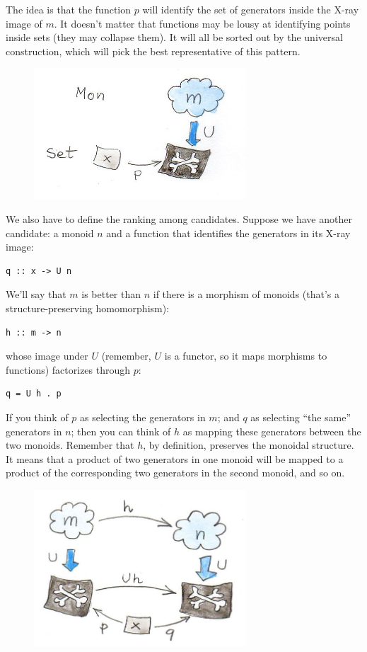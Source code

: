 The idea is that the function $p$ will identify the set of
generators inside the X-ray image of $m$. It doesn't matter that
functions may be lousy at identifying points inside sets (they may
collapse them). It will all be sorted out by the universal construction,
which will pick the best representative of this pattern.

\begin{figure}[H]
\centering
\includegraphics[width=3.12500in]{images/monoid-pattern.jpg}
\end{figure}

\noindent
We also have to define the ranking among candidates. Suppose we have
another candidate: a monoid $n$ and a function that identifies
the generators in its X-ray image:

\begin{Verbatim}
q :: x -> U n
\end{Verbatim}
We'll say that $m$ is better than $n$ if there is a
morphism of monoids (that's a structure-preserving homomorphism):

\begin{Verbatim}
h :: m -> n
\end{Verbatim}
whose image under $U$ (remember, $U$ is a functor, so it
maps morphisms to functions) factorizes through $p$:

\begin{Verbatim}
q = U h . p
\end{Verbatim}
If you think of $p$ as selecting the generators in $m$;
and $q$ as selecting ``the same'' generators in $n$; then
you can think of $h$ as mapping these generators between the two
monoids. Remember that $h$, by definition, preserves the monoidal
structure. It means that a product of two generators in one monoid will
be mapped to a product of the corresponding two generators in the second
monoid, and so on.

\begin{figure}[H]
\centering
\includegraphics[width=3.12500in]{images/monoid-ranking.jpg}
\end{figure}

